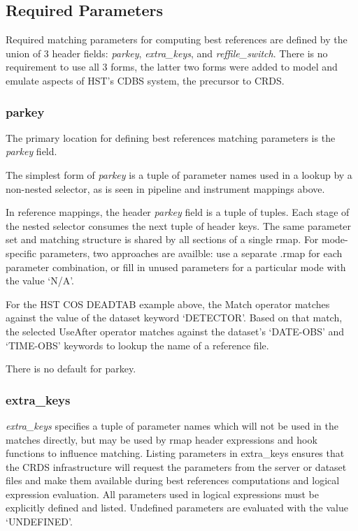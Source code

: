 \documentclass[letterpaper,10pt,english]{sphinxmanual}
\begin{document}
\subsection{Required Parameters}
\label{rmap_syntax:required-parameters}
Required matching parameters for computing best references are defined by the union of 3 header fields:  \emph{parkey},
\emph{extra\_keys}, and  \emph{reffile\_switch}.   There is no requirement to use all 3 forms,  the latter two forms were added
to model and emulate aspects of HST's CDBS system,  the precursor to CRDS.


\subsubsection{parkey}
\label{rmap_syntax:parkey}
The primary location for defining best references matching parameters is the \emph{parkey} field.

The simplest form of \emph{parkey} is a tuple of parameter names used in a lookup by a non-nested selector,  as is
seen in pipeline and instrument mappings above.

In reference mappings,  the header \emph{parkey} field is a tuple of tuples.  Each stage of the nested selector
consumes the next tuple of header keys.  The same parameter set and matching structure is shared by all sections
of a single rmap.   For mode-specific parameters,  two approaches are availble:  use a separate .rmap for each
parameter combination, or fill in unused parameters for a particular mode with the value `N/A'.

For the HST COS DEADTAB example above,   the Match operator matches against the value of the dataset keyword
`DETECTOR'.   Based on that match, the selected UseAfter operator matches against the dataset's `DATE-OBS' and
`TIME-OBS' keywords to lookup the name of a reference file.

There is no default for parkey.


\subsubsection{extra\_keys}
\label{rmap_syntax:extra-keys}
\emph{extra\_keys} specifies a tuple of parameter names which will not be used in the matches directly,  but may be used by
rmap header expressions and hook functions to influence matching.  Listing parameters in extra\_keys ensures that the
CRDS infrastructure will request the parameters from the server or dataset files and make them available during best
references computations and logical expression evaluation.   All parameters used in logical expressions must be
explicitly defined and listed.   Undefined parameters are evaluated with the value `UNDEFINED'.
\end{document}
